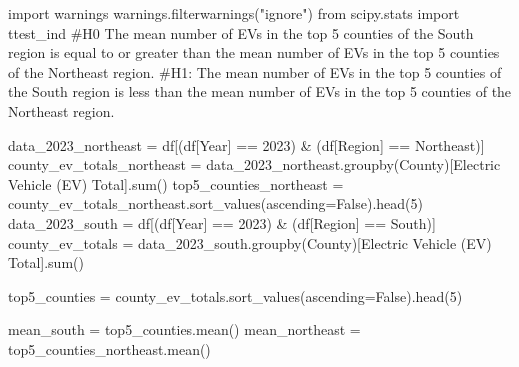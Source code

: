 \documentclass[
  letterpaper,
  DIV=11,
  numbers=noendperiod]{scrartcl}
\newenvironment{Shaded}{\begin{snugshade}}{\end{snugshade}}
\newcommand{\BuiltInTok}[1]{\textcolor[rgb]{0.00,0.23,0.31}{#1}}
\newcommand{\CommentTok}[1]{\textcolor[rgb]{0.37,0.37,0.37}{#1}}
\newcommand{\DecValTok}[1]{\textcolor[rgb]{0.68,0.00,0.00}{#1}}
\newcommand{\ImportTok}[1]{\textcolor[rgb]{0.00,0.46,0.62}{#1}}
\newcommand{\NormalTok}[1]{\textcolor[rgb]{0.00,0.23,0.31}{#1}}
\newcommand{\OperatorTok}[1]{\textcolor[rgb]{0.37,0.37,0.37}{#1}}
\newcommand{\StringTok}[1]{\textcolor[rgb]{0.13,0.47,0.30}{#1}}
\newcommand{\VariableTok}[1]{\textcolor[rgb]{0.07,0.07,0.07}{#1}}
\begin{document}
\begin{Shaded}
\begin{Highlighting}[]
\ImportTok{import}\NormalTok{ warnings}
\NormalTok{warnings.filterwarnings(}\StringTok{"ignore"}\NormalTok{)}
\ImportTok{from}\NormalTok{ scipy.stats }\ImportTok{import}\NormalTok{ ttest\_ind}
\CommentTok{\#H0 The mean number of EVs in the top 5 counties of the South region is equal to or greater than the mean number of EVs in the top 5 counties of the Northeast region. }
\CommentTok{\#H1: The mean number of EVs in the top 5 counties of the South region is less than the mean number of EVs in the top 5 counties of the Northeast region.}

\NormalTok{data\_2023\_northeast }\OperatorTok{=}\NormalTok{ df[(df[}\StringTok{\textquotesingle{}Year\textquotesingle{}}\NormalTok{] }\OperatorTok{==} \DecValTok{2023}\NormalTok{) }\OperatorTok{\&}\NormalTok{ (df[}\StringTok{\textquotesingle{}Region\textquotesingle{}}\NormalTok{] }\OperatorTok{==} \StringTok{\textquotesingle{}Northeast\textquotesingle{}}\NormalTok{)]}
\NormalTok{county\_ev\_totals\_northeast }\OperatorTok{=}\NormalTok{ data\_2023\_northeast.groupby(}\StringTok{\textquotesingle{}County\textquotesingle{}}\NormalTok{)[}\StringTok{\textquotesingle{}Electric Vehicle (EV) Total\textquotesingle{}}\NormalTok{].}\BuiltInTok{sum}\NormalTok{()}
\NormalTok{top5\_counties\_northeast }\OperatorTok{=}\NormalTok{ county\_ev\_totals\_northeast.sort\_values(ascending}\OperatorTok{=}\VariableTok{False}\NormalTok{).head(}\DecValTok{5}\NormalTok{)}
\NormalTok{data\_2023\_south }\OperatorTok{=}\NormalTok{ df[(df[}\StringTok{\textquotesingle{}Year\textquotesingle{}}\NormalTok{] }\OperatorTok{==} \DecValTok{2023}\NormalTok{) }\OperatorTok{\&}\NormalTok{ (df[}\StringTok{\textquotesingle{}Region\textquotesingle{}}\NormalTok{] }\OperatorTok{==} \StringTok{\textquotesingle{}South\textquotesingle{}}\NormalTok{)]}
\NormalTok{county\_ev\_totals }\OperatorTok{=}\NormalTok{ data\_2023\_south.groupby(}\StringTok{\textquotesingle{}County\textquotesingle{}}\NormalTok{)[}\StringTok{\textquotesingle{}Electric Vehicle (EV) Total\textquotesingle{}}\NormalTok{].}\BuiltInTok{sum}\NormalTok{()}

\NormalTok{top5\_counties }\OperatorTok{=}\NormalTok{ county\_ev\_totals.sort\_values(ascending}\OperatorTok{=}\VariableTok{False}\NormalTok{).head(}\DecValTok{5}\NormalTok{)}


\NormalTok{mean\_south }\OperatorTok{=}\NormalTok{ top5\_counties.mean()}
\NormalTok{mean\_northeast }\OperatorTok{=}\NormalTok{ top5\_counties\_northeast.mean()}


\end{Highlighting}
\end{Shaded}
\end{document}

